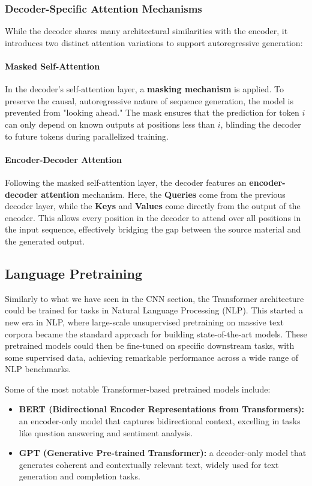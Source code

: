 \subsubsection{Decoder-Specific Attention Mechanisms}
While the decoder shares many architectural similarities with the encoder, it introduces two distinct attention variations to support autoregressive generation:

\paragraph{Masked Self-Attention}
In the decoder's self-attention layer, a \textbf{masking mechanism} is applied. To preserve the causal, autoregressive nature of sequence generation, the model is prevented from "looking ahead." The mask ensures that the prediction for token $i$ can only depend on known outputs at positions less than $i$, blinding the decoder to future tokens during parallelized training.

\paragraph{Encoder-Decoder Attention}
Following the masked self-attention layer, the decoder features an \textbf{encoder-decoder attention} mechanism. Here, the \textbf{Queries} come from the previous decoder layer, while the \textbf{Keys} and \textbf{Values} come directly from the output of the encoder. This allows every position in the decoder to attend over all positions in the input sequence, effectively bridging the gap between the source material and the generated output.

\subsection{Language Pretraining}
Similarly to what we have seen in the CNN section, the Transformer architecture could be trained for tasks in Natural Language Processing (NLP).
This started a new era in NLP, where large-scale unsupervised pretraining on massive text corpora became the standard approach for building state-of-the-art models.
These pretrained models could then be fine-tuned on specific downstream tasks, with some supervised data, achieving remarkable performance across a wide range of NLP benchmarks.

Some of the most notable Transformer-based pretrained models include:
\begin{itemize}
    \item \textbf{BERT (Bidirectional Encoder Representations from Transformers):} an encoder-only model that captures bidirectional context, excelling in tasks like question answering and sentiment analysis.
    \item \textbf{GPT (Generative Pre-trained Transformer):} a decoder-only model that generates coherent and contextually relevant text, widely used for text generation and completion tasks.
\end{itemize}

